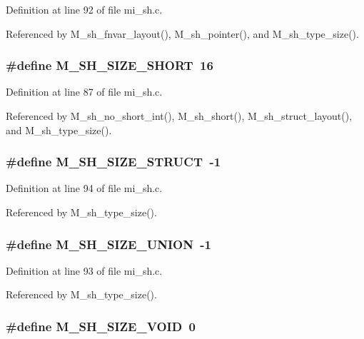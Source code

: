 Definition at line 92 of file mi\_\-sh.c.

Referenced by M\_\-sh\_\-fnvar\_\-layout(), M\_\-sh\_\-pointer(), and M\_\-sh\_\-type\_\-size().
\subsubsection{\setlength{\rightskip}{0pt plus 5cm}\#define M\_\-SH\_\-SIZE\_\-SHORT~16}\label{mi__sh_8c_207d31330b907dc729e460440062a76f}




Definition at line 87 of file mi\_\-sh.c.

Referenced by M\_\-sh\_\-no\_\-short\_\-int(), M\_\-sh\_\-short(), M\_\-sh\_\-struct\_\-layout(), and M\_\-sh\_\-type\_\-size().
\subsubsection{\setlength{\rightskip}{0pt plus 5cm}\#define M\_\-SH\_\-SIZE\_\-STRUCT~-1}\label{mi__sh_8c_9a914c548390072bbc2c92f08dc5e6d2}




Definition at line 94 of file mi\_\-sh.c.

Referenced by M\_\-sh\_\-type\_\-size().
\subsubsection{\setlength{\rightskip}{0pt plus 5cm}\#define M\_\-SH\_\-SIZE\_\-UNION~-1}\label{mi__sh_8c_afdc908e9f1da6534e156e73b30f3fe1}




Definition at line 93 of file mi\_\-sh.c.

Referenced by M\_\-sh\_\-type\_\-size().
\subsubsection{\setlength{\rightskip}{0pt plus 5cm}\#define M\_\-SH\_\-SIZE\_\-VOID~0}\label{mi__sh_8c_8239610ba10fd736802be5a3e83ffee1}




